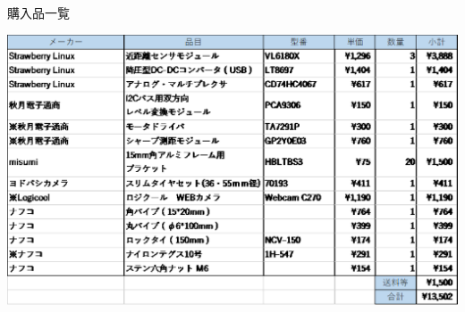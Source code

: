 \documentclass[10pt,a4j]{ujarticle}
\begin{document}
\begin{table}[h]
	\centering
	\caption{購入品一覧}
	\includegraphics[clip,scale=0.4]{kokunyu.eps}
    \label{kounyu}
\end{table}
\end{document}
